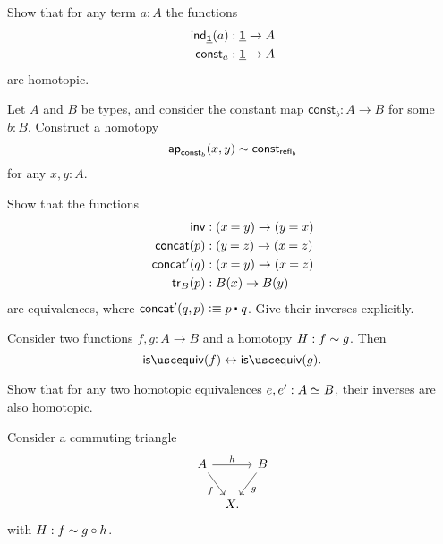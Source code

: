 \begin{exercises}
\item Show that for any term $a:A$ the functions
\begin{align*}
\mathsf{ind}_{\underline{\mathbf{1}}}(a) & : \underline{\mathbf{1}} \to A \\
\mathsf{const}_a & : \underline{\mathbf{1}} \to A
\end{align*}
are homotopic.
\item Let $A$ and $B$ be types, and consider the constant map $\mathsf{const}_b:A\to B$ for some $b:B$. Construct a homotopy
\begin{equation*}
\mathsf{ap}_{\mathsf{const}_b}(x,y)\sim \mathsf{const}_{\mathsf{refl}_{b}}
\end{equation*}
for any $x,y:A$.
\item \label{ex:equiv_grpd_ops}Show that the functions
\begin{align*}
\mathsf{inv} & :(\id{x}{y})\to(\id{y}{x}) \\
\mathsf{concat}(p) & : (\id{y}{z})\to(\id{x}{z}) \\
\mathsf{concat'}(q) & : (\id{x}{y}) \to (\id{x}{z}) \\
\mathsf{tr}_B(p) & :B(x)\to B(y)
\end{align*}
are equivalences, where $\mathsf{concat'}(q,p)\defeq \ct{p}{q}$. Give their inverses explicitly.
\item
  \begin{subexenum}
  \item \label{ex:htpy_equiv} Consider two functions $f,g:A\to B$ and a homotopy $H:f\sim g$. Then
    \begin{equation*}
      \isequiv(f)\leftrightarrow\isequiv(g).
    \end{equation*}
  \item Show that for any two homotopic equivalences $e,e':\eqv{A}{B}$, their inverses are also homotopic.
  \end{subexenum}
\item \label{ex:3_for_2}
Consider a commuting triangle
\begin{equation*}
\begin{tikzcd}[column sep=tiny]
A \arrow[rr,"h"] \arrow[dr,swap,"f"] & & B \arrow[dl,"g"] \\
& X.
\end{tikzcd}
\end{equation*}
with $H:f\sim g\circ h$.
\begin{subexenum}

\end{subexenum}
\end{exercises}
